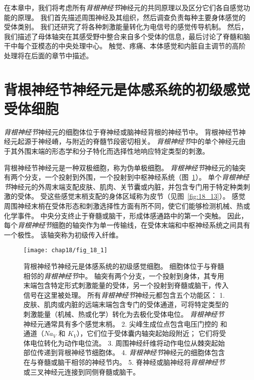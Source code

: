 在本章中，我们将考虑所有\textit{背根神经节}神经元的共同原理以及区分它们各自感觉功能的原理。
我们首先描述周围神经及其组织，然后调查负责每种主要身体感觉的受体类别。
我们还研究了将各种刺激能量转化为电信号的感觉传导机制。
然后，我们描述了母体轴突在其感受野中整合来自多个受体的信息，最后讨论了脊髓和脑干中每个亚模态的中央处理中心。
触觉、疼痛、本体感觉和内脏自主调节的高阶处理将在后面的章节中描述。



\section{背根神经节神经元是体感系统的初级感觉受体细胞}

\textit{背根神经节}神经元的细胞体位于脊神经或脑神经背根的神经节中。
背根神经节神经元起源于神经嵴，与附近的脊髓节段密切相关。
\textit{背根神经节}中的单个神经元由于其外围末端的形态学和分子特化而选择性地响应特定类型的刺激。


背根神经节神经元是一种双极细胞，称为伪单极细胞。 
\textit{背根神经节}神经元的轴突有两个分支，一个投射到外围，一个投射到中枢神经系统（图~\ref{fig:18_1}）。
单个\textit{背根神经节}神经元的外周末端支配皮肤、肌肉、关节囊或内脏，并包含专门用于特定种类刺激的受体。 
受这些感觉末梢支配的身体区域称为皮节（见图~\ref{fig:18_13}）。
感觉周围神经末梢在受体形态和刺激选择性方面有所不同，使它们能够检测机械、热或化学事件。
中央分支终止于脊髓或脑干，形成体感通路中的第一个突触。
因此，每个\textit{背根神经节}细胞的轴突作为单一传输线，在受体末端和中枢神经系统之间具有一个极性。
该轴突称为初级传入纤维。


\begin{figure}[htbp]
	\centering
	\texttt{[image: chap18/fig\_18\_1]}
	\caption{背根神经节神经元是体感系统的初级感觉细胞。 
		细胞体位于与脊髓相邻的\textit{背根神经节}中。
		轴突有两个分支，一个投射到身体，其专用末端包含特定形式刺激能量的受体，另一个投射到脊髓或脑干，传入信号在这里被处理。 
		所有\textit{背根神经节}神经元都包含五个功能区：
		1. 皮肤、肌肉或内脏的远端末端包含专门的受体通道，可将特定类型的刺激能量（机械、热或化学）转化为去极化受体电位。 
		\textit{背根神经节}神经元通常具有多个感觉末梢。
		2. 尖峰生成位点包含电压门控的  和  通道（$Na_V$ 和 $K_V$），它们位于受体囊内轴突起始段附近； 它们将受体电位转化为动作电位流。 
		3. 周围神经纤维将动作电位从棘突起始部位传递到背根神经节细胞体。 
		4. \textit{背根神经节}神经元的细胞体包含在与脊髓或脑干相邻的神经节内。 
		5. 脊神经或脑神经将\textit{背根神经节}或三叉神经元连接到同侧脊髓或脑干。}
	\label{fig:18_1}
\end{figure}


